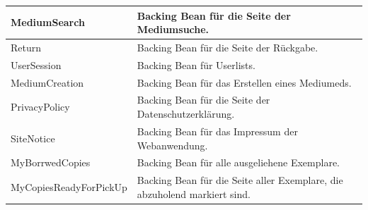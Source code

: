 \documentclass{article}
\begin{document}
\begin{center}
\begin{table}
\begin{tabular} { |p{}|p{}| }
             \hline
            MediumSearch & Backing Bean für die Seite der Mediumsuche.\\
             \hline
            Return & Backing Bean für die Seite der Rückgabe.\\
             \hline
              UserSession & Backing Bean für Userlists.\\
             \hline
            MediumCreation & Backing Bean für das Erstellen eines  Mediumeds.\\
             \hline
            PrivacyPolicy & Backing Bean für die Seite der Datenschutzerklärung.\\
            \hline
            SiteNotice & Backing Bean für das Impressum der  Webanwendung.\\
            \hline
            MyBorrwedCopies & Backing Bean für alle ausgeliehene Exemplare.\\
            \hline
            MyCopiesReadyForPickUp & Backing Bean für die Seite aller Exemplare, die abzuholend markiert sind.\\
            \hline
        \end{tabular}
        \end{table}
        \end{center}
\end{document}
